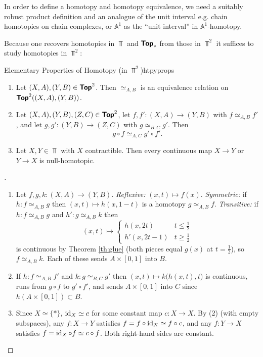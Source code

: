 In order to define a homotopy and homotopy equivalence, we need a suitably robust product definition and an analogue of the unit interval e.g. chain homotopies on chain complexes, or $\mathbb{A}^1$ as the ``unit interval'' in $\mathbb{A}^1$-homotopy.

Because one recovers homotopies in $\Top$ and $\bm{\mathsf{Top}}_*$ from those in $\Top^2$ it suffices to study homotopies in $\Top^2$:

\begin{theorem}{Elementary Properties of Homotopy (in $\Top^2$)}{htpyprops}
  \begin{enumerate}
    \item Let $(X,A),(Y,B)\in\bm{\mathsf{Top}}^{2}$. Then $\simeq_{A,B}$ is an equivalence relation on $\bm{\mathsf{Top}}^{2}((X,A),(Y,B))$.
    \item Let $(X,A),(Y,B),(Z,C)\in\bm{\mathsf{Top}}^{2}$, let $f,f':(X,A)\to(Y,B)$ with $f\simeq_{A,B}f'$, and let $g,g':(Y,B)\to(Z,C)$ with $g\simeq_{B,C}g'$. Then \[
      g\circ f\simeq_{A,C}g'\circ f'.
    \]
    \item Let $X,Y\in\Top$ with $X$ contractible. Then every continuous map $X\to Y$ or $Y\to X$ is null-homotopic.
  \end{enumerate}
\end{theorem}

\begin{proof}[]
  \begin{enumerate}
    \item Let $f,g,k:(X,A)\to(Y,B)$. \emph{Reflexive:} $(x,t)\mapsto f(x)$. \emph{Symmetric:} if $h:f\simeq_{A,B}g$ then $(x,t)\mapsto h(x,1-t)$ is a homotopy $g\simeq_{A,B}f$. \emph{Transitive:} if $h:f\simeq_{A,B}g$ and $h':g\simeq_{A,B}k$ then \[
      (x,t)\mapsto\begin{cases}h(x,2t)&t\leq\tfrac12\\h'(x,2t-1)&t\geq\tfrac12\end{cases}
    \]
    is continuous by Theorem \ref{th:glue} (both pieces equal $g(x)$ at $t=\frac12$), so $f\simeq_{A,B}k$. Each of these sends $A\times[0,1]$ into $B$.
    \item If $h:f\simeq_{A,B}f'$ and $k:g\simeq_{B,C}g'$ then $(x,t)\mapsto k\big(h(x,t),t\big)$ is continuous, runs from $g\circ f$ to $g'\circ f'$, and sends $A\times[0,1]$ into $C$ since $h(A\times[0,1])\subset B$.
    \item Since $X\simeq\{\ast\}$, $\operatorname{id}_X\simeq c$ for some constant map $c:X\to X$. By (2) (with empty subspaces), any $f:X\to Y$ satisfies $f=f\circ\operatorname{id}_X\simeq f\circ c$, and any $f:Y\to X$ satisfies $f=\operatorname{id}_X\circ f\simeq c\circ f$. Both right-hand sides are constant.
  \end{enumerate}
\end{proof}

